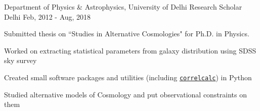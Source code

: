 

\begin{cventries}
	
	\cventry
	{Department of Physics \& Astrophysics, University of Delhi} %
	{Research Scholar} %
	{Delhi} %
	{Feb, 2012 - Aug, 2018} %
	{
		\begin{cvitems} 
			\item {Submitted thesis on ``Studies in Alternative Cosmologies" for Ph.D. in Physics.}
			\item {Worked on extracting statistical parameters from galaxy distribution using SDSS sky survey}
			\item {Created small software packages and utilities (including \href{http://github.com/rohinkumar/correlcalc}{\texttt{correlcalc}}) in Python}
			\item {Studied alternative models of Cosmology and put observational constraints on them}
		\end{cvitems}
	}
\end{cventries}

